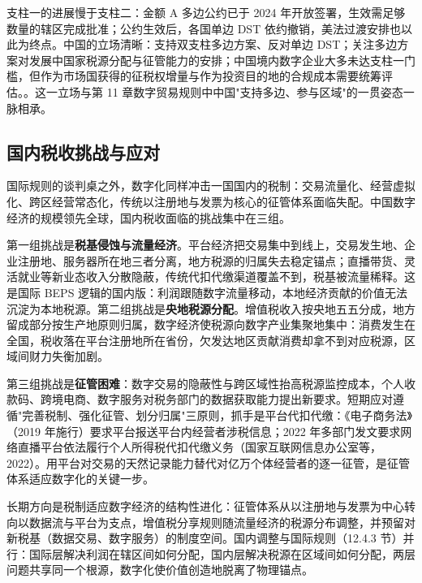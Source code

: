 支柱一的进展慢于支柱二：金额 A 多边公约已于 2024 年开放签署，生效需足够数量的辖区完成批准；公约生效后，各国单边 DST 依约撤销，美法过渡安排也以此为终点。中国的立场清晰：支持双支柱多边方案、反对单边 DST；关注多边方案对发展中国家税源分配与征管能力的安排；中国境内数字企业大多未达支柱一门槛，但作为市场国获得的征税权增量与作为投资目的地的合规成本需要统筹评估。。这一立场与第 11 章数字贸易规则中中国"支持多边、参与区域"的一贯姿态一脉相承。

\subsection{国内税收挑战与应对}

国际规则的谈判桌之外，数字化同样冲击一国国内的税制：交易流量化、经营虚拟化、跨区经营常态化，传统以注册地与发票为核心的征管体系面临失配。中国数字经济的规模领先全球，国内税收面临的挑战集中在三组。

第一组挑战是\textbf{税基侵蚀与流量经济}。平台经济把交易集中到线上，交易发生地、企业注册地、服务器所在地三者分离，地方税源的归属失去稳定锚点；直播带货、灵活就业等新业态收入分散隐蔽，传统代扣代缴渠道覆盖不到，税基被流量稀释。这是国际 BEPS 逻辑的国内版：利润跟随数字流量移动，本地经济贡献的价值无法沉淀为本地税源。第二组挑战是\textbf{央地税源分配}。增值税收入按央地五五分成，地方留成部分按生产地原则归属，数字经济使税源向数字产业集聚地集中：消费发生在全国，税收落在平台注册地所在省份，欠发达地区贡献消费却拿不到对应税源，区域间财力失衡加剧。

第三组挑战是\textbf{征管困难}：数字交易的隐蔽性与跨区域性抬高税源监控成本，个人收款码、跨境电商、数字服务对税务部门的数据获取能力提出新要求。短期应对遵循"完善税制、强化征管、划分归属"三原则，抓手是平台代扣代缴：《电子商务法》（2019 年施行）要求平台报送平台内经营者涉税信息；2022 年多部门发文要求网络直播平台依法履行个人所得税代扣代缴义务（国家互联网信息办公室等，2022）。用平台对交易的天然记录能力替代对亿万个体经营者的逐一征管，是征管体系适应数字化的关键一步。

长期方向是税制适应数字经济的结构性进化：征管体系从以注册地与发票为中心转向以数据流与平台为支点，增值税分享规则随流量经济的税源分布调整，并预留对新税基（数据交易、数字服务）的制度空间。国内调整与国际规则（12.4.3 节）并行：国际层解决利润在辖区间如何分配，国内层解决税源在区域间如何分配，两层问题共享同一个根源，数字化使价值创造地脱离了物理锚点。

